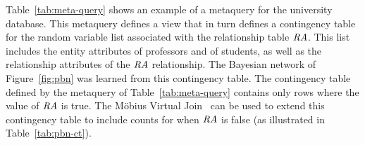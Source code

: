 %
%

Table~\ref{tab:meta-query} shows an example of a metaquery for the university database. This metaquery defines a view that in turn defines a contingency table for the random variable list associated with the relationship table $\mathit{RA}$. This list includes the entity attributes of professors and of students, as well as the relationship attributes of the $\mathit{RA}$ relationship. 
The Bayesian network of Figure~\ref{fig:pbn} was learned from this contingency table. 
The  contingency table defined by the metaquery of Table~\ref{tab:meta-query} contains only rows where the value of $\mathit{RA}$ is true. The M\"obius Virtual Join~\cite{Qian2014a} can be used to extend this contingency table to include counts for when $\mathit{RA}$ is false (as illustrated in Table~\ref{tab:pbn-ct}).

